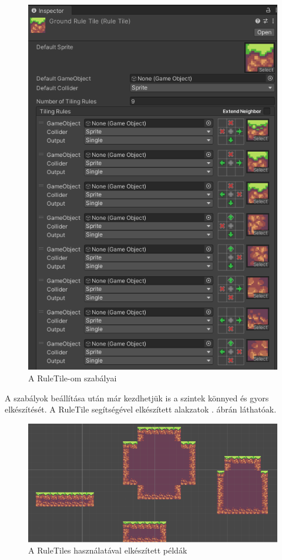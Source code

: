 \begin{figure}[ht]
\centering
\includegraphics[scale = 0.5]{images/ruletilerules.png}
\caption{A RuleTile-om szabályai}
\label{fig:ruletilerules}
\end{figure}

\newpage
A szabályok beállítása után már kezdhetjük is a szintek könnyed és gyors elkészítését. \cite{unityruletile} A RuleTile segítségével elkészített alakzatok . ábrán láthatóak.

\begin{figure}[ht]
\centering
\includegraphics[scale = 0.5]{images/ruletileshapes.png}
\caption{A RuleTiles használatával elkészített példák}
\label{fig:ruletileshapes}
\end{figure}

